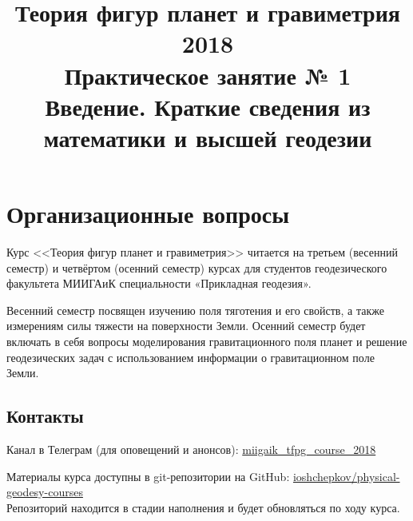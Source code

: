 \documentclass[11pt, a4paper]{article}
\title{{\Large Теория фигур планет и гравиметрия 2018}\\ 
    {\bf\Large Практическое занятие № 1} \\
{\Large Введение. Краткие сведения из математики и высшей геодезии}}
\author{}
\date{\DTMusedate{lessondate}}
\theoremstyle{plain}
\theoremstyle{definition}
\theoremstyle{remark}
\begin{document}
\maketitle

\section{Организационные вопросы}

Курс <<Теория фигур планет и гравиметрия>> читается на третьем (весенний семестр) и четвёртом
(осенний семестр) курсах для студентов геодезического факультета МИИГАиК специальности «Прикладная геодезия».

Весенний семестр посвящен изучению поля тяготения и его свойств, а также измерениям силы тяжести на
поверхности Земли. 
Осенний семестр будет включать в себя вопросы моделирования гравитационного поля планет и решение
геодезических задач с использованием информации о гравитационном поле Земли.

\subsection{Контакты}

Канал в Телеграм (для оповещений и анонсов):
\href{https://t.me/miigaik_tfpgcourse_2018}{miigaik\_tfpg\_course\_2018}

Материалы курса доступны в git-репозитории на GitHub:
\href{https://github.com/ioshchepkov/physical-geodesy-courses}{ioshchepkov/physical-geodesy-courses}\\

Репозиторий находится в стадии наполнения и будет обновляться по ходу курса.
\end{document}
